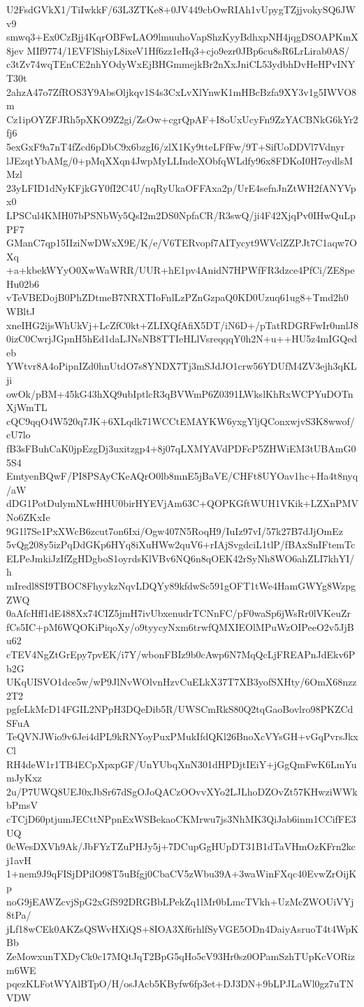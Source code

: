 U2FsdGVkX1/TiIwkkF/63L3ZTKe8+0JV449cbOwRIAh1vUpygTZjjvokySQ6JWv9
smwq3+Ex0CzBjj4KqrOBFwLAO9lmuuhoVapShzKyyBdhxpNH4jqgDSOAPKmX8jev
MIf9774/1EVFlShiyL8ixeV1Hf6zz1eHq3+cjo9ezr0JBp6cu8sR6LrLirab0AS/
c3tZv74wqTEnCE2nhYOdyWxEjBHGmmejkBr2nXxJniCL53ydbhDvHeHPvINYT30t
2ahzA47o7ZfROS3Y9AbsOljkqv1S4s3CxLvXlYnwK1mHBcBzfa9XY3v1g5IWVO8m
Cz1ipOYZFJRh5pXKO9Z2gi/ZsOw+cgrQpAF+I8oUxUcyFn9ZzYACBNkG6kYr2fj6
5exGxF9a7nT4fZcd6pDbC9x6bzgI6/zlX1Ky9tteLFfFw/9T+SifUoDDVl7Vdnyr
lJEzqtYbAMg/0+pMqXXqn4JwpMyLLIndeXObfqWLdfy96x8FDKoI0H7eydlsMMzl
23yLFID1dNyKFjkGY0fI2C4U/nqRyUkaOFFAxa2p/UrE4sefnJnZtWH2fANYVpx0
LPSCul4KMH07bPSNbWy5QsI2m2DS0NpfaCR/R3swQ/ji4F42XjqPv0IHwQuLpPF7
GManC7qp15IIziNwDWxX9E/K/e/V6TERvopf7AITycyt9WVclZZPJt7C1aqw7OXq
+a+kbekWYyO0XwWaWRR/UUR+hE1pv4AnidN7HPWfFR3dzce4PfCi/ZE8peHu02b6
vTeVBEDojB0PhZDtmeB7NRXTIoFnlLzPZnGzpaQ0KD0Uzuq61ug8+Tmd2h0WBltJ
xneIHG2ijsWhUkVj+LcZfC0kt+ZLIXQfAfiX5DT/iN6D+/pTatRDGRFwIr0unlJ8
0izC0CwrjJGpnH5hEd1daLJNsNB8TTIeHLlVsreqqqY0h2N+u++HU5z4mIGQedeb
YWtvr8A4oPipnIZd0hnUtdO7s8YNDX7Tj3mSJdJO1crw56YDUfM4ZV3ejh3qKLji
owOk/pBM+45kG43hXQ9ubIptlcR3qBVWmP6Z0391LWkslKhRxWCPYuDOTnXjWmTL
cQC9qqO4W520q7JK+6XLqdk71WCCtEMAYKW6yxgYljQConxwjvS3K8wwof/cU7lo
fB3sFBuhCaK0jpEzgDj3uxitzgp4+8j07qLXMYAVdPDFcP5ZHWiEM3tUBAmG05S4
EmtyenBQwF/PI8PSAyCKeAQrO0lb8mnE5jBaVE/CHFt8UYOav1hc+Ha4t8nyq/aW
dDG1PotDulymNLwHHU0birHYEVjAm63C+QOPKGftWUH1VKik+LZXnPMVNo6ZKxIe
9G1l7Se1PxXWcB6zcut7on6Ixi/Ogw407N5RoqH9/IuIz97vI/57k27B7dJjOmEz
5vQg208y5izPqDdGKp6HYq8iXuHWw2quV6+rIAjSvgdciL1tlP/fBAxSnIFtemTc
ELPeJmkiJzIfZgHDgboS1oyrdsKlVBv6NQ6n8qOEK42rSyNh8WO6ahZLI7khYI/h
mIredl8SI9TBOC8FhyykzNqvLDQYy89kfdwSc591gOFT1tWe4HamGWYg8WzpgZWQ
0aAfcHff1dE488Xx74CIZ5jmH7ivUbxenudrTCNnFC/pF0waSp6jWsRr0lVKeuZr
fCs5IC+pM6WQOKiPiqoXy/o9tyycyNxm6trwfQMXIEOlMPuWzOIPeeO2v5JjBu62
cTEV4NgZtGrEpy7pvEK/i7Y/wbonFBIz9b0cAwp6N7MqQcLjFREAPnJdEkv6Pb2G
UKqUISVO1dce5w/wP9JlNvWOlvnHzvCuELkX37T7XB3yofSXHty/6OmX68nzz2T2
pgfeLkMcD14FGIL2NPpH3DQeDib5R/UWSCmRkS80Q2tqGaoBovlro98PKZCdSFuA
TeQVNJWio9v6Jei4dPL9kRNYoyPuxPMukIfdQKl26BnoXcVYsGH+vGqPvrsJkxCl
RH4deW1r1TB4ECpXpxpGF/UnYUbqXnN301dHPDjtIEiY+jGgQmFwK6LmYumJyKxz
2u/P7UWQ8UEJ0xJbSr67dSgOJoQACzOOvvXYo2LJLhoDZOvZt57KHwziWWkbPmsV
cTCjD60ptjumJECttNPpnExWSBekaoCKMrwu7js3NhMK3QiJab6inm1CCifFE3UQ
0cWesDXVh9Ak/JbFYzTZuPHJy5j+7DCupGgHUpDT31B1dTaVHmOzKFrn2kcj1avH
1+nem9J9qFISjDPilO98T5uBfgj0CbaCV5zWbu39A+3waWinFXqc40EvwZrOijKp
noG9jEAWZcvjSpG2xGfS92DRGBbLPekZq1lMr0bLmcTVkh+UzMcZWOUiVYj8tPa/
jLf18wCEk0AKZsQSWvHXiQS+8IOA3Xf6rhlfSyVGE5ODn4DaiyAsruoT4t4WpKBb
ZeMowxunTXDyCk0c17MQtJqT2BpG5qHo5cV93Hr0sz0OPamSzhTUpKcVORizm6WE
pqezKLFotWYAlBTpO/H/osJAcb5KByfw6fp3et+DJ3DN+9bLPJLaWl0gz7uTNVDW
